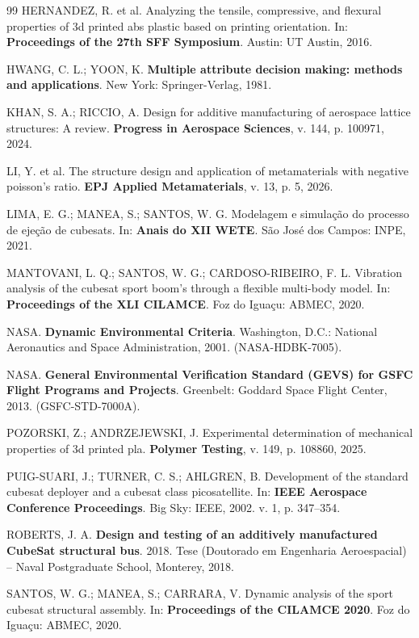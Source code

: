 \documentclass[12pt,a4paper]{report}
\begin{document}
\begin{thebibliography}{99}
HERNANDEZ, R. et al. Analyzing the tensile, compressive, and flexural properties of 3d printed abs plastic based on printing orientation. In: \textbf{Proceedings of the 27th SFF Symposium}. Austin: UT Austin, 2016.

HWANG, C. L.; YOON, K. \textbf{Multiple attribute decision making: methods and applications}. New York: Springer-Verlag, 1981.

KHAN, S. A.; RICCIO, A. Design for additive manufacturing of aerospace lattice structures: A review. \textbf{Progress in Aerospace Sciences}, v. 144, p. 100971, 2024.

LI, Y. et al. The structure design and application of metamaterials with negative poisson's ratio. \textbf{EPJ Applied Metamaterials}, v. 13, p. 5, 2026.

LIMA, E. G.; MANEA, S.; SANTOS, W. G. Modelagem e simulação do processo de ejeção de cubesats. In: \textbf{Anais do XII WETE}. São José dos Campos: INPE, 2021.

MANTOVANI, L. Q.; SANTOS, W. G.; CARDOSO-RIBEIRO, F. L. Vibration analysis of the cubesat sport boom's through a flexible multi-body model. In: \textbf{Proceedings of the XLI CILAMCE}. Foz do Iguaçu: ABMEC, 2020.

NASA. \textbf{Dynamic Environmental Criteria}. Washington, D.C.: National Aeronautics and Space Administration, 2001. (NASA-HDBK-7005).

NASA. \textbf{General Environmental Verification Standard (GEVS) for GSFC Flight Programs and Projects}. Greenbelt: Goddard Space Flight Center, 2013. (GSFC-STD-7000A).

POZORSKI, Z.; ANDRZEJEWSKI, J. Experimental determination of mechanical properties of 3d printed pla. \textbf{Polymer Testing}, v. 149, p. 108860, 2025.

PUIG-SUARI, J.; TURNER, C. S.; AHLGREN, B. Development of the standard cubesat deployer and a cubesat class picosatellite. In: \textbf{IEEE Aerospace Conference Proceedings}. Big Sky: IEEE, 2002. v. 1, p. 347--354.

ROBERTS, J. A. \textbf{Design and testing of an additively manufactured CubeSat structural bus}. 2018. Tese (Doutorado em Engenharia Aeroespacial) -- Naval Postgraduate School, Monterey, 2018.

SANTOS, W. G.; MANEA, S.; CARRARA, V. Dynamic analysis of the sport cubesat structural assembly. In: \textbf{Proceedings of the CILAMCE 2020}. Foz do Iguaçu: ABMEC, 2020.


\end{thebibliography}
\end{document}
